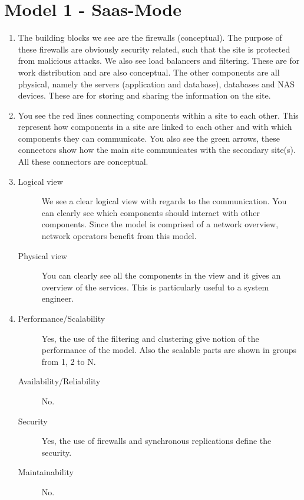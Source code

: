 \section{Model 1 - Saas-Mode}
\begin{enumerate}
	\item The building blocks we see are the firewalls (conceptual).
	The purpose of these firewalls are obviously security related, such that the site is protected from malicious attacks.
	We also see load balancers and filtering.
	These are for work distribution and are also conceptual.
	The other components are all physical, namely the servers (application and database), databases and NAS devices.
	These are for storing and sharing the information on the site.
	
	\item You see the red lines connecting components within a site to each other.
	This represent how components in a site are linked to each other and with which components they can communicate.
	You also see the green arrows, these connectors show how the main site communicates with the secondary site(s).
	All these connectors are conceptual.
	
	\item 
    \begin{description}
        \item[Logical view] We see a clear logical view with regards to the communication.
	    You can clearly see which components should interact with other components.
        Since the model is comprised of a network overview, network operators benefit from this model.
        \item[Physical view] You can clearly see all the components in the view and it gives an overview of the services.
        This is particularly useful to a system engineer.
    \end{description}
	
	\item
	\begin{description}
		\item[Performance/Scalability] Yes, the use of the filtering and clustering give notion of the performance of the model.
		Also the scalable parts are shown in groups from 1, 2 to N.
		\item[Availability/Reliability] No.
		\item[Security] Yes, the use of firewalls and synchronous replications define the security.
		\item[Maintainability] No.
	\end{description}
	

\end{enumerate}
